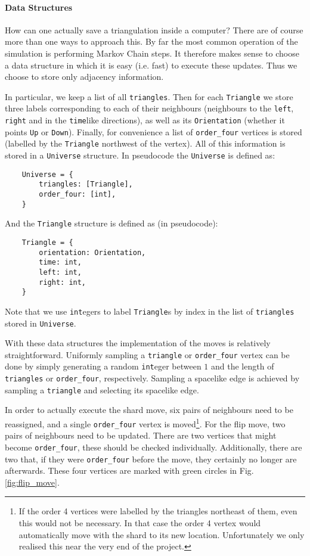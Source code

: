 \paragraph{Data Structures}
How can one actually save a triangulation inside a computer? There are of course more than one ways to approach this. By far the most common operation of the simulation is performing Markov Chain steps. It therefore makes sense to choose a data structure in which it is easy (i.e. fast) to execute these updates. Thus we choose to store only adjacency information.

In particular, we keep a list of all \verb|triangles|. Then for each \verb|Triangle| we store three labels corresponding to each of their neighbours (neighbours to the \verb|left|, \verb|right| and in the \verb|time|like directions), as well as its \verb|Orientation| (whether it points \verb|Up| or \verb|Down|). Finally, for convenience a list of \verb|order_four| vertices is stored (labelled by the \verb|Triangle| northwest of the vertex). All of this information is stored in a \verb|Universe| structure. In pseudocode the \verb|Universe| is defined as:
\begin{verbatim}
    Universe = {
        triangles: [Triangle],
        order_four: [int],
    }
\end{verbatim}
And the \verb|Triangle| structure is defined as (in pseudocode):
\begin{verbatim}
    Triangle = {
        orientation: Orientation,
        time: int,
        left: int,
        right: int,
    }
\end{verbatim}
Note that we use \verb|int|egers to label \verb|Triangle|s by index in the list of \verb|triangles| stored in \verb|Universe|.

With these data structures the implementation of the moves is relatively straightforward. Uniformly sampling a \verb|triangle| or \verb|order_four| vertex can be done by simply generating a random \verb|int|eger between $1$ and the length of \verb|triangles| or \verb|order_four|, respectively. Sampling a spacelike edge is achieved by sampling a \verb|triangle| and selecting its spacelike edge.

In order to actually execute the shard move, six pairs of neighbours need to be reassigned, and a single \verb|order_four| vertex is moved\footnote{If the order 4 vertices were labelled by the triangles northeast of them, even this would not be necessary. In that case the order 4 vertex would automatically move with the shard to its new location. Unfortunately we only realised this near the very end of the project.}. For the flip move, two pairs of neighbours need to be updated. There are two vertices that might become \verb|order_four|, these should be checked individually. Additionally, there are two that, if they were \verb|order_four| before the move, they certainly no longer are afterwards. These four vertices are marked with green circles in Fig. \ref{fig:flip_move}.

